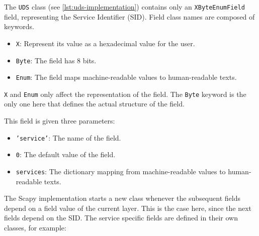 The \texttt{UDS} class (see \autoref{lst:uds-implementation}) contains only an \texttt{XByteEnumField} field, representing the Service Identifier (SID). Field class names are composed of keywords.
\begin{samepage}
\begin{itemize}
    \item \texttt{X}: Represent its value as a hexadecimal value for the user.
    \item \texttt{Byte}: The field has 8 bits.
    \item \texttt{Enum}: The field maps machine-readable values to human-readable texts.
\end{itemize}
\end{samepage}

\texttt{X} and \texttt{Enum} only affect the representation of the field. The \texttt{Byte} keyword is the only one here that defines the actual structure of the field.

This field is given three parameters:

\begin{itemize}
    \item \texttt{'service'}: The name of the field.
    \item \texttt{0}: The default value of the field.
    \item \texttt{services}: The dictionary mapping from machine-readable values to human-readable texts.
\end{itemize}

The Scapy implementation starts a new class whenever the subsequent fields depend on a field value of the current layer. This is the case here, since the next fields depend on the SID. The service specific fields are defined in their own classes, for example:


